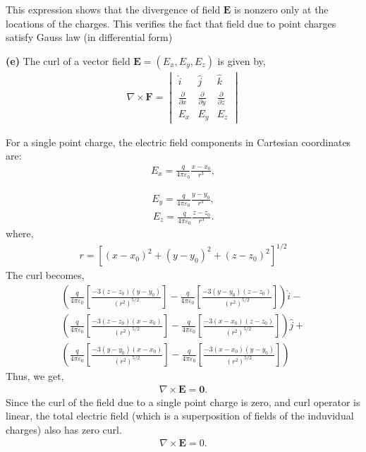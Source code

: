 \documentclass{article}
\begin{document}
This expression shows that the divergence of field $\mathbf{E}$ is nonzero only at the locations of the charges. This verifies the fact that field due to point charges satisfy Gauss law (in differential form) 

\textbf{(e)} The curl of a vector field $\mathbf{E} = (E_x, E_y, E_z)$ is given by,
\begin{align*}
\nabla \times \mathbf{F} = \begin{vmatrix}
\hat{i} & \hat{j} & \hat{k} \\
\frac{\partial}{\partial x} & \frac{\partial}{\partial y} & \frac{\partial}{\partial z} \\
E_x & E_y & E_z
\end{vmatrix}
\end{align*}

For a single point charge, the electric field components in Cartesian coordinates are:
\begin{align*}
    E_x = \frac{q}{4\pi\varepsilon_0} \frac{x - x_0}{r^3},
\end{align*}

\begin{align*}
    E_y = \frac{q}{4\pi\varepsilon_0} \frac{y - y_0}{r^3},
\end{align*}
\begin{align*}
    E_z = \frac{q}{4\pi\varepsilon_0} \frac{z - z_0}{r^3}.
\end{align*}
where, 
\begin{align*}
    r = [(x - x_0)^2 + (y - y_0)^2 + (z - z_0)^2]^{1/2}
\end{align*}
The curl becomes,
\begin{align*}
    \left( \frac{q}{4\pi\varepsilon_0} \left[ \frac{-3(z - z_0)(y - y_0)}{(r^2)^{5/2}} \right] - \frac{q}{4\pi\varepsilon_0} \left[ \frac{-3(y - y_0)(z - z_0)}{(r^2)^{5/2}} \right] \right)\hat{i } - \\
    \left( \frac{q}{4\pi\varepsilon_0} \left[ \frac{-3(z - z_0)(x - x_0)}{(r^2)^{5/2}} \right] -  \frac{q}{4\pi\varepsilon_0} \left[ \frac{-3(x - x_0)(z - z_0)}{(r^2)^{5/2}} \right]  \right)\hat{j} + \\
    \left( \frac{q}{4\pi\varepsilon_0} \left[ \frac{-3(y - y_0)(x - x_0)}{(r^2)^{5/2}} \right] - \frac{q}{4\pi\varepsilon_0} \left[ \frac{-3(x - x_0)(y - y_0)}{(r^2)^{5/2}} \right]  \right)
\end{align*}
Thus, we get,
\begin{align*}
    \nabla \times \mathbf{E} = \mathbf{0}.
\end{align*}
Since the curl of the field due to a single point charge is zero, and curl operator is linear, the total electric field (which is a superposition of fields of the induvidual charges) also has zero curl.
\begin{align*}
    \nabla \times \mathbf{E} = 0.
\end{align*}
\end{document}
